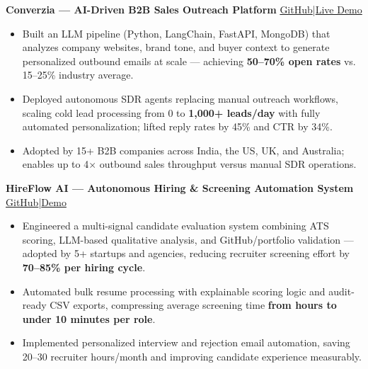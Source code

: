 \documentclass[a4paper,10pt]{article}
\newcommand{\entry}[2]{\textbf{#1} \hfill \small{#2}}
\begin{document}
\noindent\entry{Converzia — AI-Driven B2B Sales Outreach Platform}{\href{https://github.com/ujjwaltiwari01/converzia-version-0.3}{GitHub}\enspace|\enspace\href{https://converzia.netlify.app/}{Live Demo}}\\[1.5pt]
{\small
\begin{itemize}
  \item Built an LLM pipeline (Python, LangChain, FastAPI, MongoDB) that analyzes company websites, brand tone, and buyer context to generate personalized outbound emails at scale — achieving \textbf{50--70\% open rates} vs. 15--25\% industry average.
  \item Deployed autonomous SDR agents replacing manual outreach workflows, scaling cold lead processing from 0 to \textbf{1,000+ leads/day} with fully automated personalization; lifted reply rates by 45\% and CTR by 34\%.
  \item Adopted by 15+ B2B companies across India, the US, UK, and Australia; enables up to 4$\times$ outbound sales throughput versus manual SDR operations.
\end{itemize}
}
 
\vspace{1.5pt}
\noindent\entry{HireFlow AI — Autonomous Hiring \& Screening Automation System}{\href{https://github.com/ujjwaltiwari01/HireFlow-AI-Where-Hiring-Meets-Automation}{GitHub}\enspace|\enspace\href{https://www.linkedin.com/posts/ujjwal-tiwaree_ai-hiring-automation-activity-7391012182408470528-np2A}{Demo}}\\[1.5pt]
{\small
\begin{itemize}
  \item Engineered a multi-signal candidate evaluation system combining ATS scoring, LLM-based qualitative analysis, and GitHub/portfolio validation — adopted by 5+ startups and agencies, reducing recruiter screening effort by \textbf{70--85\% per hiring cycle}.
  \item Automated bulk resume processing with explainable scoring logic and audit-ready CSV exports, compressing average screening time \textbf{from hours to under 10 minutes per role}.
  \item Implemented personalized interview and rejection email automation, saving 20--30 recruiter hours/month and improving candidate experience measurably.
\end{itemize}
}
 
\end{document}
